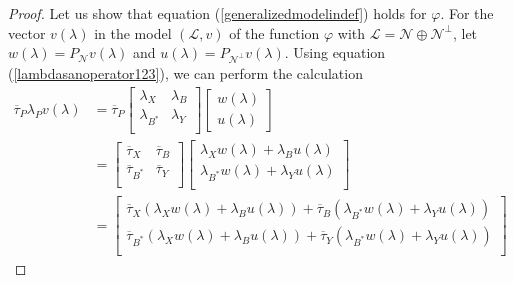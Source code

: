 \documentclass[11pt, reqno]{amsart}
\newcommand\1{\boldsymbol {1}}
\numberwithin{equation}{section}
\begin{document}
\begin{proof}
Let us show that equation  (\ref{generalizedmodelindef}) holds for $\varphi$. For the vector $v(\lambda)$ in the model $(\mathcal{L},v)$ of the function $\varphi$ with $\mathcal{L}=\mathcal{N}\oplus \mathcal{N}^{\perp}$, let $w(\lambda)=P_{\mathcal{N}}v(\lambda)$ and $u(\lambda)=P_{\mathcal{N}^{\perp}}v(\lambda)$. Using equation
 (\ref{lambdasanoperator123}), we can perform the calculation
\begin{align}
    \overline{\tau}_{P}\lambda_{P}v(\lambda)   &= \overline{\tau}_{P}\begin{bmatrix}
                                            \lambda_{X} & \lambda_{B} \\
                                            \lambda_{B^{*}} & \lambda_{Y} \\
                                            \end{bmatrix}\begin{bmatrix}
                                                w(\lambda)\\
                                                u(\lambda)
                                                \end{bmatrix}\nonumber\\ 
                                        &=\begin{bmatrix}
                                            \overline{\tau}_{X} & \overline{\tau}_{B} \\
                                            \overline{\tau}_{B^{*}} & \overline{\tau}_{Y} \\
                                            \end{bmatrix}\begin{bmatrix}
                                            \lambda_{X}w(\lambda)+ \lambda_{B}u(\lambda) \\
                                            \lambda_{B^{*}}w(\lambda)+\lambda_{Y}u(\lambda) \\
                                            \end{bmatrix}\nonumber\\
                                        &=\begin{bmatrix}
                                           \overline{\tau}_{X} ( \lambda_{X}w(\lambda)+ \lambda_{B}u(\lambda) )+\overline{\tau}_{B}(\lambda_{B^{*}}w(\lambda)+\lambda_{Y}u(\lambda)) \\
                                            \overline{\tau}_{B^{*}} ( \lambda_{X}w(\lambda)+ \lambda_{B}u(\lambda) )+\overline{\tau}_{Y}(\lambda_{B^{*}}w(\lambda)+\lambda_{Y}u(\lambda))\\

\end{bmatrix}
\end{align}
\end{proof}
\end{document}
